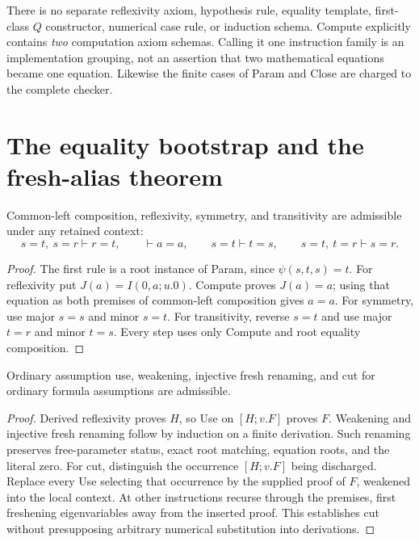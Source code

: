 There is no separate reflexivity axiom, hypothesis rule, equality template,
first-class $Q$ constructor, numerical case rule, or induction schema.
Compute explicitly contains \emph{two} computation axiom schemas.  Calling
it one instruction family is an implementation grouping, not an assertion
that two mathematical equations became one equation.  Likewise the
finite cases of Param and Close are charged to the complete checker.

\section{The equality bootstrap and the fresh-alias theorem}
\label{sec:rp-bootstrap}

\begin{lemma}
Common-left composition, reflexivity, symmetry, and transitivity are
admissible under any retained context:
\[
 s=t,\ s=r\vdash r=t,\qquad
 \vdash a=a,\qquad
 s=t\vdash t=s,\qquad
 s=t,\ t=r\vdash s=r.
\]
\end{lemma}
\begin{proof}
The first rule is a root instance of Param, since $\psi(s,t,s)=t$.
For reflexivity put $J(a)=I(0,a;u.0)$.  Compute proves $J(a)=a$;
using that equation as both premises of common-left composition gives
$a=a$.  For symmetry, use major $s=s$ and minor $s=t$.  For
transitivity, reverse $s=t$ and use major $t=r$ and minor $t=s$.
Every step uses only Compute and root equality composition.
\end{proof}

\begin{lemma}
Ordinary assumption use, weakening, injective fresh renaming, and cut
for ordinary formula assumptions are admissible.
\end{lemma}
\begin{proof}
Derived reflexivity proves $H$, so Use on $[H;v.F]$ proves $F$.
Weakening and injective fresh renaming follow by induction on a finite
derivation.  Such renaming preserves free-parameter status, exact root
matching, equation roots, and the literal zero.  For cut, distinguish the
occurrence $[H;v.F]$ being discharged.  Replace every Use selecting that
occurrence by the supplied proof of $F$, weakened into the local context.
At other instructions recurse through the premises, first freshening
eigenvariables away from the inserted proof.  This establishes cut
without presupposing arbitrary numerical substitution into derivations.
\end{proof}


